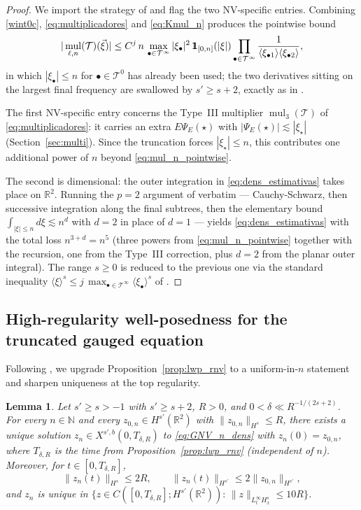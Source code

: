 \documentclass[a4paper,
11pt,  reqno]{amsart}
\newcommand{\mathbbm}[1]{\mathchoice%
    {\hbox{\sffamily 1\kern-.40em 1}}%
    {\hbox{\sffamily 1\kern-.40em 1}}%
    {\hbox{\scriptsize\sffamily 1\kern-.30em 1}}%
    {\hbox{\tiny\sffamily 1\kern-.25em 1}}}%
\newcommand{\jap}[1]{\langle #1 \rangle}
\newcommand{\5}{\textup{V}}
\newcommand{\ind}{\mathbbm 1}
\newcommand{\dl}{\delta}
\newtheorem{lemma}[theorem]{Lemma}
\theoremstyle{remark}
\newcommand{\R}{\mathbb{R}}
\newcommand{\bul}{\bullet}
\newcommand{\TT}{\mathcal{T}}
\renewcommand{\l}{\ell}
\newcommand{\N}{\mathbb{N}}
\DeclareMathOperator{\mul}{mul}
\numberwithin{equation}{section}
\numberwithin{theorem}{section}
\begin{document}
\begin{proof}
We import the strategy of \cite[Lemma~5.2]{chcora} and flag the two
NV-specific entries. Combining \eqref{wint0c},
\eqref{eq:multiplicadores} and \eqref{eq:Kmul_n} produces the
pointwise bound
\begin{equation}\label{eq:mul_n_pointwise}
|\mul_{\l,n}(\TT)(\vec\xi)|
\le C^j\, n\, \max_{\bul\in\TT^\infty}|\xi_\bul|^2\,
\ind_{[0,n]}(|\xi|)
\prod_{\bul\in\TT^\infty}\frac{1}{\jap{\xi_{\bul1}}\jap{\xi_{\bul2}}},
\end{equation}
in which $|\xi_\bul|\le n$ for $\bul\in\TT^0$ has already been used;
the two derivatives sitting on the largest final frequency are
swallowed by $s'\ge s+2$, exactly as in \cite{chcora}.

The first NV-specific entry concerns the Type~III multiplier
$\mul_3(\TT)$ of \eqref{eq:multiplicadores}: it carries an extra
$E\Psi_E(\star)$ with $|\Psi_E(\star)|\lesssim|\xi_\star|$
(Section~\ref{sec:multi}). Since the truncation forces
$|\xi_\star|\le n$, this contributes one additional power of $n$
beyond \eqref{eq:mul_n_pointwise}.

The second is dimensional: the outer integration in
\eqref{eq:dens_estimativas} takes place on $\R^2$. Running the
$p=2$ argument of \cite[Lemma~5.2]{chcora} verbatim ---
Cauchy-Schwarz, then successive integration along the final
subtrees, then the elementary bound
$\int_{|\xi|\le n}d\xi\lesssim n^d$ with $d=2$ in place of $d=1$ ---
yields \eqref{eq:dens_estimativas} with the total loss
$n^{3+d}=n^5$ (three powers from \eqref{eq:mul_n_pointwise} together
with the recursion, one from the Type~III correction, plus $d=2$
from the planar outer integral). The range $s\ge 0$ is reduced to
the previous one via the standard inequality
$\jap{\xi}^s\le j\,\max_{\bul\in\TT^\infty}\jap{\xi_\bul}^s$
of \cite[Lemma~5.2]{chcora}.
\end{proof}

\subsection{High-regularity well-posedness for the truncated gauged equation}

Following \cite[Lemma~5.4]{chcora}, we upgrade
Proposition~\ref{prop:lwp_rnv} to a uniform-in-$n$ statement and
sharpen uniqueness at the top regularity.

\begin{lemma}\label{lem:zn_nv}
Let $s'\ge s>-1$ with $s'\ge s+2$, $R>0$, and
$0<\dl\ll R^{-1/(2s+2)}$. For every $n\in\N$ and every
$z_{0,n}\in H^{s'}(\R^2)$ with $\|z_{0,n}\|_{H^s}\le R$, there exists
a unique solution $z_n\in X^{s',b}(0,T_{\dl,R})$ to
\eqref{eq:GNV_n_dens} with $z_n(0)=z_{0,n}$, where $T_{\dl,R}$ is
the time from Proposition~\ref{prop:lwp_rnv} (independent of $n$).
Moreover, for $t\in[0,T_{\dl,R}]$,
\begin{equation}\label{eq:bounds_zn_nv}
\|z_n(t)\|_{H^s}\le 2R,
\qquad
\|z_n(t)\|_{H^{s'}}\le 2\|z_{0,n}\|_{H^{s'}},
\end{equation}
and $z_n$ is unique in
$\{z\in C([0,T_{\dl,R}]; H^{s'}(\R^2)):\,
\|z\|_{L^\infty_t H^s_x}\le 10R\}$.
\end{lemma}
\end{document}
